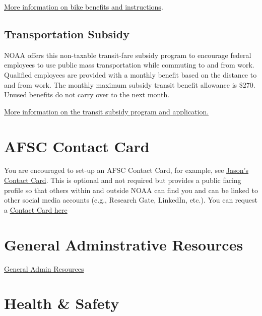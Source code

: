 \documentclass[
  letterpaper,
  DIV=11,
  numbers=noendperiod]{scrreprt}
\begin{document}
\href{https://sites.google.com/noaa.gov/cao/about-ocao/logistics-operations-division/noaa-transit-subsidy-program}{More
information on bike benefits and instructions}.

\hypertarget{transportation-subsidy}{%
\subsection{Transportation Subsidy}\label{transportation-subsidy}}

NOAA offers this non-taxable transit-fare subsidy program to encourage
federal employees to use public mass transportation while commuting to
and from work. Qualified employees are provided with a monthly benefit
based on the distance to and from work. The monthly maximum subsidy
transit benefit allowance is \$270. Unused benefits do not carry over to
the next month.

\href{https://sites.google.com/noaa.gov/cao/about-ocao/logistics-operations-division/noaa-transit-subsidy-program}{More
information on the transit subsidy program and application.}

\hypertarget{afsc-contact-card}{%
\section{AFSC Contact Card}\label{afsc-contact-card}}

You are encouraged to set-up an AFSC Contact Card, for example, see
\href{https://www.fisheries.noaa.gov/contact/jason-e-jannot}{Jason's
Contact Card}. This is optional and not required but provides a public
facing profile so that others within and outside NOAA can find you and
can be linked to other social media accounts (e.g., Research Gate,
LinkedIn, etc.). You can request a
\href{https://docs.google.com/forms/d/e/1FAIpQLSdDfxoDycZjcmXDfPY_KnHwb2vPQ8HTzfFCSVt-qOvq_xPIZw/viewform}{Contact
Card here}

\hypertarget{general-adminstrative-resources}{%
\section{General Adminstrative
Resources}\label{general-adminstrative-resources}}

\href{https://sites.google.com/noaa.gov/myafsc/administrative/general-admin}{General
Admin Resources}

\hypertarget{health-safety}{%
\section{Health \& Safety}\label{health-safety}}
\end{document}
